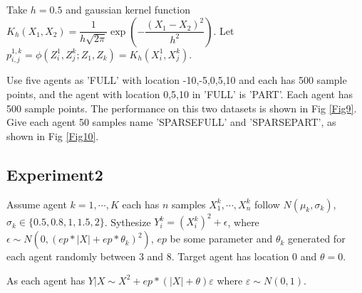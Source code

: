 \documentclass[12pt, a4paper, oneside]{article}
\begin{document}
    Take $h=0.5$ and gaussian kernel function $K_h(X_1,X_2)=\dfrac{1}{h\sqrt{2\pi}}\exp\left( -\dfrac{(X_1-X_2)^2}{h^2} \right)$. Let $p_{i,j}^{1,k}=\phi(Z_i^1,Z_j^k;Z_1,Z_k)=K_h(X_i^1,X_j^k)$.


    Use five agents as 'FULL' with location -10,-5,0,5,10 and each has 500 sample points, and the agent with location 0,5,10 in 'FULL' is 'PART'. Each agent has 500 sample points. The performance on this two datasets is shown in Fig \ref{Fig9}. Give each agent 50 samples name 'SPARSEFULL' and 'SPARSEPART', as shown in Fig \ref{Fig10}.

\subsection{Experiment2}
    Assume agent $k=1,\cdots,K$ each has $n$ samples $X_1^k,\cdots,X_n^k$ follow $N(\mu_k,\sigma_k)$, $\sigma_k\in\{0.5,0.8,1,1.5,2\}$. Sythesize $Y_i^k=(X_i^k)^2+\epsilon$, where $\epsilon\sim N(0,(ep*|X|+ep*\theta_k)^2)$, $ep$ be some parameter and $\theta_k$ generated for each agent randomly between $3$ and $8$. Target agent has location $0$ and $\theta=0$.

    As each agent has $Y|X\sim X^2+ep*(|X|+\theta)\varepsilon$ where $\varepsilon\sim N(0,1)$.
\newpage
\end{document}
